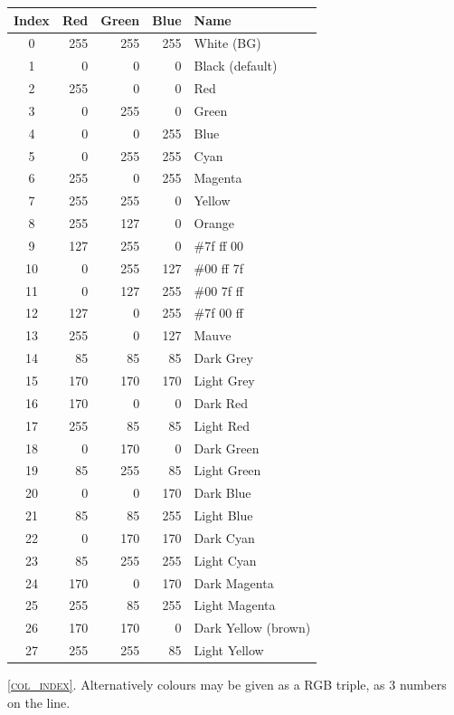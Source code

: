 \documentclass[11pt,twoside,english]{article}
\begin{document}
\begin{description}
\begin{description}
\begin{table}[!ht]
      \begin{center}
        \begin{tabular}{|c|rrr|l|}
          \hline 
          Index&      Red&      Green&      Blue&      Name\\
          \hline 
          0&      255&      255&      255&      White (BG)\\
          1&      0&      0&      0&      Black (default)\\
          2&      255&      0&      0&      Red\\
          3&      0&      255&      0&      Green\\
          4&      0&      0&      255&      Blue\\
          5&      0&      255&      255&      Cyan\\
          6&      255&      0&      255&      Magenta\\
          7&      255&      255&      0&      Yellow\\
          8&      255&      127&      0&      Orange\\
          9&      127&      255&      0&      \#7f ff 00\\
          10&      0&      255&      127&     \#00 ff 7f \\
          11&      0&      127&      255&    \#00 7f ff \\
          12&      127&      0&      255&     \#7f 00 ff \\
          13&      255&      0&      127&      Mauve\\
          14&      85&      85&      85&      Dark Grey\\
          15&      170&      170&      170&      Light Grey\\
          16 & 170 & 0 & 0 & Dark Red\\
          17 & 255 & 85 & 85 & Light Red\\
          18 & 0 & 170 & 0 & Dark Green\\
          19 & 85 & 255 & 85 & Light Green\\
          20 & 0 & 0 & 170 & Dark Blue\\
          21 & 85 & 85 & 255 & Light Blue\\
          22 & 0 & 170 & 170 & Dark Cyan\\
          23 & 85 & 255 & 255 & Light Cyan\\
          24 & 170 & 0 & 170 & Dark Magenta\\
          25 & 255 & 85 & 255 & Light Magenta\\
          26 & 170 & 170 & 0 & Dark Yellow (brown)\\
          27 & 255 & 255 & 85 & Light Yellow\\
          \hline
        \end{tabular}
      \end{center}
    \end{table}
    \textsc{\autoref{col_index}}. Alternatively colours may be given
    as a RGB triple, as 3 numbers on the line.


\end{description}
\end{description}
\end{document}
